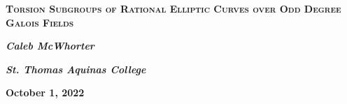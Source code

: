 {
\begin{frame}[plain]
\phantom{.} \par\vspace{4.0cm}
\begin{center}
	{\Large\bfseries\color{UniGray} \textsc{Torsion Subgroups of Rational Elliptic Curves over Odd Degree Galois Fields}} 
\end{center} \vspace{1.5cm} 

\begin{center}
	{\bfseries\large\color{UniGray}\textit{Caleb McWhorter} \par
	\bfseries\textit{St. Thomas Aquinas College}} \par\vspace{0cm}
\end{center} 

\begin{center}
	{\bfseries\small\color{UniGray} October 1, 2022}
	\end{center} 
\end{frame}
}



